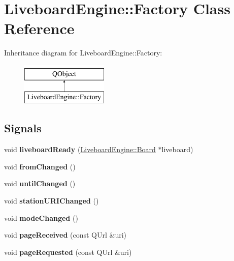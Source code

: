 \hypertarget{classLiveboardEngine_1_1Factory}{}\section{Liveboard\+Engine\+:\+:Factory Class Reference}
\label{classLiveboardEngine_1_1Factory}
Inheritance diagram for Liveboard\+Engine\+:\+:Factory\+:\begin{figure}[H]
\begin{center}
\leavevmode
\includegraphics[height=2.000000cm]{classLiveboardEngine_1_1Factory}
\end{center}
\end{figure}
\subsection*{Signals}
\begin{DoxyCompactItemize}
\item 
\mbox{\label{classLiveboardEngine_1_1Factory_adfd318c2ca3b7852ae6fb8f2ec6c531d}} 
void {\bfseries liveboard\+Ready} (\mbox{\hyperlink{classLiveboardEngine_1_1Board}{Liveboard\+Engine\+::\+Board}} $\ast$liveboard)
\item 
\mbox{\label{classLiveboardEngine_1_1Factory_aecd8f5df55d1a7604f9f93f8420df015}} 
void {\bfseries from\+Changed} ()
\item 
\mbox{\label{classLiveboardEngine_1_1Factory_a41c86f68cdef04156116d8519c2fa040}} 
void {\bfseries until\+Changed} ()
\item 
\mbox{\label{classLiveboardEngine_1_1Factory_ab849fa14c77ca43c0aa62f3e44775d69}} 
void {\bfseries station\+U\+R\+I\+Changed} ()
\item 
\mbox{\label{classLiveboardEngine_1_1Factory_a7b7b0b3dff6670b4603174c79f0e22fa}} 
void {\bfseries mode\+Changed} ()
\item 
\mbox{\label{classLiveboardEngine_1_1Factory_ac688f2fe85e61735f8c8caea1ffacc2b}} 
void {\bfseries page\+Received} (const Q\+Url \&uri)
\item 
\mbox{\label{classLiveboardEngine_1_1Factory_a7b90ae3a8251afc0a76316d180fe8d40}} 
void {\bfseries page\+Requested} (const Q\+Url \&uri)
\end{DoxyCompactItemize}
